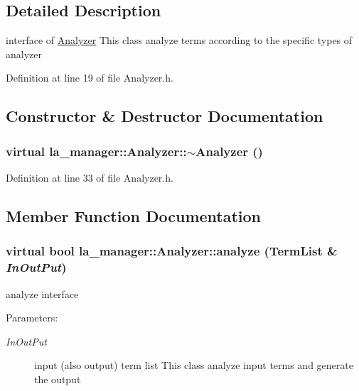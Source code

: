 \subsection{Detailed Description}
interface of \hyperlink{classla__manager_1_1Analyzer}{Analyzer} This class analyze terms according to the specific types of analyzer 

Definition at line 19 of file Analyzer.h.

\subsection{Constructor \& Destructor Documentation}
\hypertarget{classla__manager_1_1Analyzer_2dff111165f053298d3887806ef172ec}{
\subsubsection[{$\sim$Analyzer}]{\setlength{\rightskip}{0pt plus 5cm}virtual la\_\-manager::Analyzer::$\sim$Analyzer ()}}
\label{classla__manager_1_1Analyzer_2dff111165f053298d3887806ef172ec}




Definition at line 33 of file Analyzer.h.

\subsection{Member Function Documentation}
\hypertarget{classla__manager_1_1Analyzer_23414b773ec2070957e9aa3d6a7d8b78}{
\subsubsection[{analyze}]{\setlength{\rightskip}{0pt plus 5cm}virtual bool la\_\-manager::Analyzer::analyze ({\bf TermList} \& {\em InOutPut})}}
\label{classla__manager_1_1Analyzer_23414b773ec2070957e9aa3d6a7d8b78}


analyze interface 

\begin{Desc}
\item[Parameters:]
\begin{description}
\item[{\em InOutPut}]input (also output) term list This class analyze input terms and generate the output \end{description}
\end{Desc}


